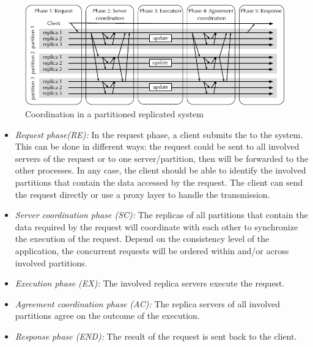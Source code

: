 \begin{figure}[ht!]
  \begin{minipage}[b]{1.0\linewidth}
  \centering
        \includegraphics[width=1\linewidth]{figures/replication-coordination}
  \end{minipage}
  \caption{Coordination in a partitioned replicated system}
  \label{fig:replication:coordination}
\end{figure}

\begin{itemize}
  \item \textit{Request phase(RE):} In the request phase, a client submits the
     to the system. This can be done in different ways: the request could
  be sent to all involved servers of the request or to one server/partition,
  then will be forwarded to the other processes. In any case, the client should
  be able to identify the involved partitions that contain the data accessed by
  the request. The client can send the request directly or use a proxy layer to
  handle the transmission.
  \item \textit{Server coordination phase (SC):} The replicas of all partitions
  that contain the data required by the request will coordinate with each other
  to synchronize the execution of the request. Depend on the consistency level
  of the application, the concurrent requests will be ordered within and/or across
  involved partitions.
  \item \textit{Execution phase (EX):} The involved replica servers execute the request.
  \item \textit{Agreement coordination phase (AC):} The replica servers of all involved
  partitions agree on the outcome of the execution.
  \item \textit{Response phase (END):} The result of the request is sent back to the client.
\end{itemize}

